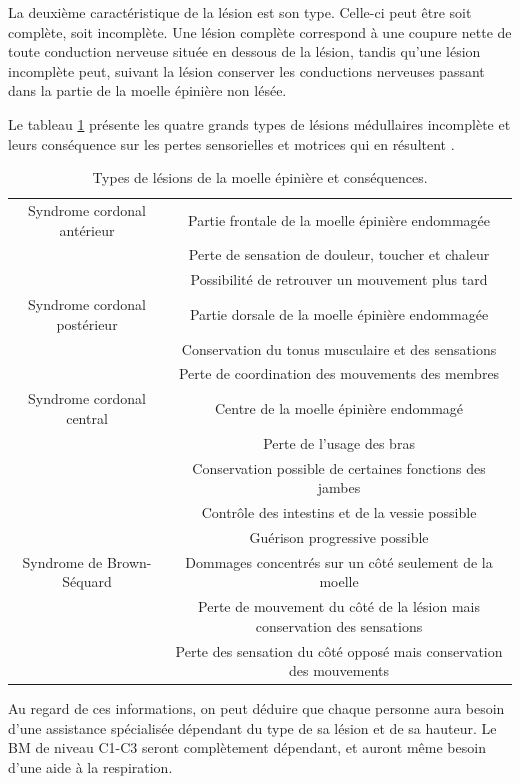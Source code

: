 \documentclass[letterpaper, twoside, 12pt, memoire, creativecommons, hyperref]{thETS}
\begin{document}
La deuxième caractéristique de la lésion est son type. Celle-ci peut être soit complète, soit incomplète. Une lésion complète correspond à une coupure nette de toute conduction nerveuse située en dessous de la lésion, tandis qu'une lésion incomplète peut, suivant la lésion conserver les conductions nerveuses passant dans la partie de la moelle épinière non lésée.

Le tableau \ref{tab:typelesion} présente les quatre grands types de lésions médullaires incomplète et leurs conséquence sur les pertes sensorielles et motrices qui en résultent \citep{apparelyzed2008}.

\begin{table}[ht]
	\caption{Types de lésions de la moelle épinière et conséquences.}
		\begin{tabular}{|c|c|}
		\hline
	    	 	Syndrome cordonal antérieur & Partie frontale de la moelle épinière endommagée\\
	    	 	& Perte de sensation de douleur, toucher et chaleur\\
	    	 	& Possibilité de retrouver un mouvement plus tard\\
	    \hline
	    	 	Syndrome cordonal postérieur & Partie dorsale de la moelle épinière endommagée\\
	    	 	& Conservation du tonus musculaire et des sensations \\
	    	 	& Perte de coordination des mouvements des membres\\
	    \hline
	    		Syndrome cordonal central & Centre de la moelle épinière endommagé\\
	    		& Perte de l'usage des bras\\
	    		& Conservation possible de certaines fonctions des jambes\\
	    		& Contrôle des intestins et de la vessie possible \\
	    		& Guérison progressive possible\\
	    	\hline
	    		Syndrome de Brown-Séquard & Dommages concentrés sur un côté seulement de la moelle \\
	    		& Perte de mouvement du côté de la lésion mais conservation des sensations\\
	    		& Perte des sensation du côté opposé mais conservation des mouvements\\
	    \hline
		\end{tabular}
	\label{tab:typelesion}
\end{table}

Au regard de ces informations, on peut déduire que chaque personne aura besoin d'une assistance spécialisée dépendant du type de sa lésion et de sa hauteur. Le BM de niveau C1-C3 seront complètement dépendant, et auront même besoin d'une aide à la respiration. 
\end{document}
